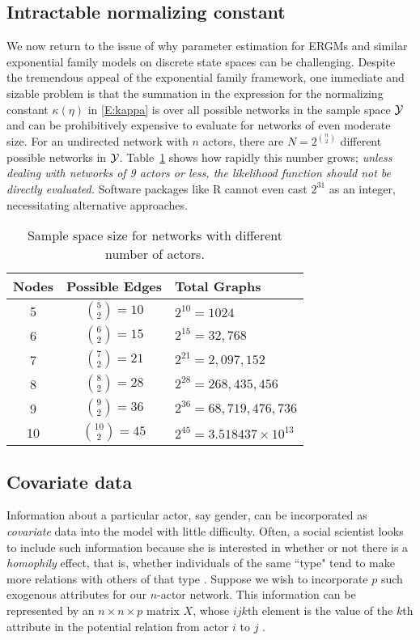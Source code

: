 \subsection{Intractable normalizing constant} \label{S:intractable}
We now return to the issue of why parameter estimation for ERGMs and 
similar exponential family models on discrete state spaces can be challenging.
Despite the tremendous appeal of the exponential family framework, one 
immediate and sizable problem is that the summation in the expression for  the 
normalizing constant $\kappa(\eta)$ in \eqref{E:kappa}
is over all possible networks in the sample space ${\mathcal Y}$ and can be prohibitively expensive to 
evaluate for networks of even moderate size.
For an undirected network with $n$ actors, there are $N=2^{{n\choose 2} }$ 
different possible networks in ${\mathcal Y}$.  Table~\ref{T:number graphs} shows how rapidly this number grows; 
\emph{unless dealing with networks of 9 actors or less, the likelihood function 
should not be directly evaluated.}  Software packages like R cannot even cast 
$2^{31}$ as an integer,
necessitating alternative approaches.

\begin{table}[h] \label{T:number graphs}
\caption{Sample space size for networks with different number of actors.}
\begin{tabular}{ccl}
\hline 
Nodes & Possible Edges & Total Graphs \\ [1ex]
\hline
5 & ${5 \choose 2} = 10$ & $2^{10} = 1024$ \\ [1ex]
6 & ${6 \choose 2} = 15$ & $2^{15} = 32,768$ \\ [1ex]
7 & ${7 \choose 2} = 21$ & $2^{21} = 2,097,152$ \\ [1ex]
8 & ${8 \choose 2} = 28$ & $2^{28} = 268,435,456$ \\ [1ex]
9 & ${9 \choose 2} = 36$ & $2^{36} = 68,719,476,736$ \\ [1ex]
10 & ${10 \choose 2} = 45$ & $2^{45} = 3.518437\times10^{13}$ \\ [1ex]
\hline 
\end{tabular}
\end{table}

\subsection{Covariate data}
Information about a particular actor, say gender, can be incorporated as 
\textit{covariate} data into the model with little difficulty.
Often, a social scientist looks to include such information because she is interested in
whether or not there is a \emph{homophily} effect, that is, whether individuals of the 
same ``type" tend to make more relations with others of that type \citep{Wasserman:1994}.  
Suppose we wish to incorporate $p$ such exogenous attributes for our $n$-actor network.  
This information can be represented by an $n \times n \times p$ matrix $X$, whose 
$ijk$th element is the value of the $k$th attribute in the potential relation from actor
$i$ to $j$ \citep*{Fienberg:1981,ergm}.  

